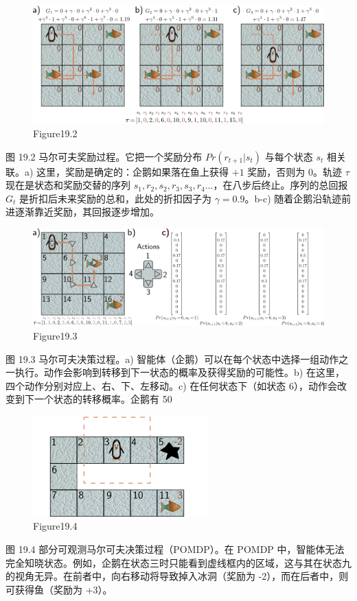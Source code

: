 \begin{figure}[h!]
\centering
\includegraphics[width=0.7\linewidth]{png/chapter19/ReinforceMDP2.png}
\caption{Figure19.2}
\end{figure}
图 19.2 马尔可夫奖励过程。它把一个奖励分布 \(Pr(r_{t+1}|s_t)\) 与每个状态 \(s_t\) 相关联。a) 这里，奖励是确定的：企鹅如果落在鱼上获得 \(+1\) 奖励，否则为 \(0\)。轨迹 \(\tau\) 现在是状态和奖励交替的序列 \(s_1, r_2, s_2, r_3, s_3, r_4 \ldots\)，在八步后终止。序列的总回报 \(G_t\) 是折扣后未来奖励的总和，此处的折扣因子为 \(\gamma = 0.9\)。b-c) 随着企鹅沿轨迹前进逐渐靠近奖励，其回报逐步增加。

\begin{figure}[h!]
\centering
\includegraphics[width=0.7\linewidth]{png/chapter19/ReinforceMDP3.png}
\caption{Figure19.3}
\end{figure}
图 19.3 马尔可夫决策过程。a) 智能体（企鹅）可以在每个状态中选择一组动作之一执行。动作会影响到转移到下一状态的概率及获得奖励的可能性。b) 在这里，四个动作分别对应上、右、下、左移动。c) 在任何状态下（如状态 6），动作会改变到下一个状态的转移概率。企鹅有 50%

\begin{figure}[h!]
\centering
\includegraphics[width=0.7\linewidth]{png/chapter19/ReinforcePOMDP.png}
\caption{Figure19.4}
\end{figure}
图 19.4 部分可观测马尔可夫决策过程（POMDP）。在 POMDP 中，智能体无法完全知晓状态。例如，企鹅在状态三时只能看到虚线框内的区域，这与其在状态九的视角无异。在前者中，向右移动将导致掉入冰洞（奖励为 -2），而在后者中，则可获得鱼（奖励为 +3）。

